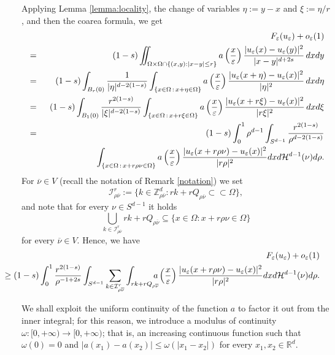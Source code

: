 \documentclass[11pt,a4paper,reqno]{amsart}
\theoremstyle{plain}
\theoremstyle{definition}
\newcommand\e{\varepsilon}
\newcommand\Rd{\mathbb{R}^d}
\theoremstyle{remark}
\begin{document}
Applying  Lemma \ref{lemma:locality}, the change of variables $\eta:=y-x$ and $\xi:= \eta/r$, and then the coarea formula, we get
\begin{eqnarray*} %
    \nonumber&&
\hskip-1.5cm    F_\e(u_\e)+o_\e(1) \\ \nonumber
&=& (1-s) \iint_{\Omega\times \Omega \cap \{(x,y) : |x-y|\leq r\}}a\left(\frac{x}{\e}\right)\frac{|u_\e(x)-u_\e(y)|^2}{|x-y|^{d+2s}}\,dxdy \\ \nonumber
    &=& (1-s) \int_{B_{r}(0)}\frac{1}{|\eta|^{d-2(1-s)}}\int_{\{x\in\Omega \,:\,x+\eta\in\Omega\}}a\left(\frac{x}{\e}\right)\frac{|u_\e(x+\eta)-u_\e(x)|^2}{|\eta|^2}\,dxd\eta \\ \nonumber
    &=& (1-s) \int_{B_1(0)}\frac{r^{2(1-s)}}{|\xi|^{d-2(1-s)}}\int_{\{x\in\Omega \,:\,x+r\xi\in\Omega\}}a\left(\frac{x}{\e}\right)\frac{|u_\e(x+r\xi)-u_\e(x)|^2}{|r\xi|^2}\,dxd\xi \\ \nonumber
    &=& (1-s) \int_0^1 \rho^{d-1} \int_{S^{d-1}} \frac{r^{2(1-s)}}{\rho^{d-2(1-s)}}\\ \nonumber 
    && \qquad \qquad \qquad \int_{\{x\in\Omega \,:\,x+r\rho\nu\in\Omega\}}a\left(\frac{x}{\e}\right)\frac{|u_\e(x+r\rho\nu)-u_\e(x)|^2}{|r\rho|^2} dxd\mathcal{H}^{d-1}(\nu) d\rho.
\end{eqnarray*}
For $\overline{\nu}\in V$ (recall the notation of Remark \ref{notation}) we set
\[
\mathcal{I}^r_{\rho\overline{\nu}}:=\{k\in \mathbb Z_{\rho\overline{\nu}}^d : rk+rQ_{\rho\overline{\nu}} \subset \subset \Omega\},
\]
and note that for every $\nu\in S^{d-1}$ it holds
\[
\bigcup_{k\in \mathcal{I}^r_{\rho \overline{\nu}}} rk+rQ_{\rho\overline{\nu}} \subseteq \{x\in \Omega : x+r\rho\nu\in\Omega\}
\]
 for every $\overline{\nu}\in V$. Hence, we have
\begin{eqnarray}\nonumber \label{liminf1}  
&&\hskip-1.5cm F_\e(u_\e)+o_\e(1) \\
&& \hskip-1.5cm \geq(1-s)  \int_0^1 \frac{r^{2(1-s)}}{\rho^{-1+2s}} \int_{S^{d-1}} \sum_{k\in \mathcal{I}^r_{\rho\overline{\nu}}} \int_{rk+rQ_{\rho\overline{\nu}}} {\hskip-0.3cm} a\left(\frac{x}{\e}\right)\frac{|u_\e(x+r\rho\nu)-u_\e(x)|^2}{|r\rho|^2} dxd\mathcal{H}^{d-1}(\nu) d\rho.
 \end{eqnarray}
 
We shall exploit the uniform continuity of the function $a$ to factor it out from the inner integral; for this reason, we introduce a modulus of continuity $\omega:[0,+\infty)\rightarrow[0,+\infty)$; that is, an increasing continuous function such that $\omega(0)=0$ and $|a(x_1)-a(x_2)|\leq\omega(|x_1-x_2|)$ for every $x_1,x_2\in\Rd$.
\end{document}
